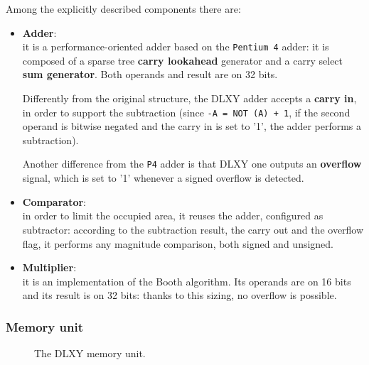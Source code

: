 Among the explicitly described components there are:
\begin{itemize}
	\item \textbf{Adder}: \\
		it is a performance-oriented adder based on the \texttt{Pentium 4}
		adder: it is composed of a sparse tree \textbf{carry lookahead}
		generator and a carry select \textbf{sum generator}.
		Both operands and result are on 32 bits.

		Differently from the original structure, the DLXY adder accepts
		a \textbf{carry in}, in order to support the subtraction
		(since \texttt{-A = NOT (A) + 1}, if the second operand is
		bitwise negated and the carry in is set to '1', the adder
		performs a subtraction).

		Another difference from the \texttt{P4} adder is that DLXY one
		outputs an \textbf{overflow} signal, which is set to '1' whenever
		a signed overflow is detected.
	\item \textbf{Comparator}: \\
		in order to limit the occupied area, it reuses the adder,
		configured as subtractor: according to the subtraction result,
		the carry out and the overflow flag, it performs any magnitude
		comparison, both signed and unsigned.
	\item \textbf{Multiplier}: \\
		it is an implementation of the Booth algorithm.
		Its operands are on 16 bits and its result is on 32 bits: thanks
		to this sizing, no overflow is possible.
\end{itemize}

\subsubsection{Memory unit}
\begin{figure}[H]
	\centering
	\caption{The DLXY memory unit.}
	\label{fig:memory_unit}
\end{figure}

